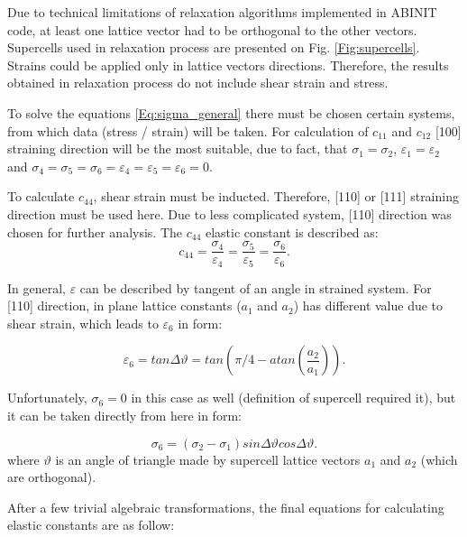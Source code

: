 Due to technical limitations of relaxation algorithms implemented in ABINIT code, at least one lattice vector had to be orthogonal to the other vectors.
Supercells used in relaxation process are presented on Fig. \ref{Fig:supercells}.
Strains could be applied only in lattice vectors directions.
Therefore, the results obtained in relaxation process do not include shear strain and stress.

To solve the equations \ref{Eq:sigma_general} there must be chosen certain systems, from which data (stress / strain) will be taken.
For calculation of $c_{11}$ and $c_{12}$ [100] straining direction will be the most suitable, due to fact, that $\sigma_1=\sigma_2$, $\varepsilon_1=\varepsilon_2$ and $\sigma_4=\sigma_5=\sigma_6=\varepsilon_4=\varepsilon_5=\varepsilon_6=0$.

To calculate $c_{44}$, shear strain must be inducted.
Therefore, [110] or [111] straining direction must be used here.
Due to less complicated system, [110] direction was chosen for further analysis.
The $c_{44}$ elastic constant is described as:
\begin{equation}
    \label{Eq:c44}
    c_{44}=\frac{\sigma_4}{\varepsilon_4}=\frac{\sigma_5}{\varepsilon_5}=\frac{\sigma_6}{\varepsilon_6}.
\end{equation}

In general, $\varepsilon$ can be described by tangent of an angle in strained system.
For [110] direction, in plane lattice constants ($a_1$ and $a_2$) has different value due to shear strain, which leads to $\varepsilon_6$ in form:

\begin{equation}
    \label{Eq:shear_strain}
    \varepsilon_6=tan\Delta\vartheta=tan(\pi/4-atan(\frac{a_2}{a_1})).
\end{equation}

Unfortunately, $\sigma_6=0$ in this case as well (definition of supercell required it), but it can be taken directly from here\cite{stress_tensor} in form:

\begin{equation}
    \label{Eq:shear_stress}
    \sigma_6=(\sigma_2-\sigma_1)sin\Delta\vartheta cos\Delta\vartheta.
\end{equation}
where $\vartheta$ is an angle of triangle made by supercell lattice vectors $a_1$ and $a_2$ (which are orthogonal).

After a few trivial algebraic transformations, the final equations for calculating elastic constants are as follow:

